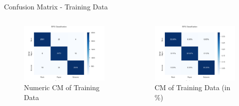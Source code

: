 \documentclass[aspectratio=169]{beamer}
\begin{document}
{	\begin{frame}{Confusion Matrix - Training Data}
		\begin{columns}
			\begin{column}{.5\textwidth}
				\begin{figure}
					\centering
					\includegraphics[width=1\textwidth]{img/CFM_final_train_numeric.png}
					\caption{Numeric CM of Training Data}
				\end{figure}      
			\end{column}
			\begin{column}{.5\textwidth}
				\begin{figure}
					\centering
					\includegraphics[width=1\textwidth]{img/CFM_final_train_percent.png}
					\caption{CM of Training Data (in \%)}
				\end{figure}      
			\end{column} 
		\end{columns}
	\end{frame}
	
}
\end{document}
